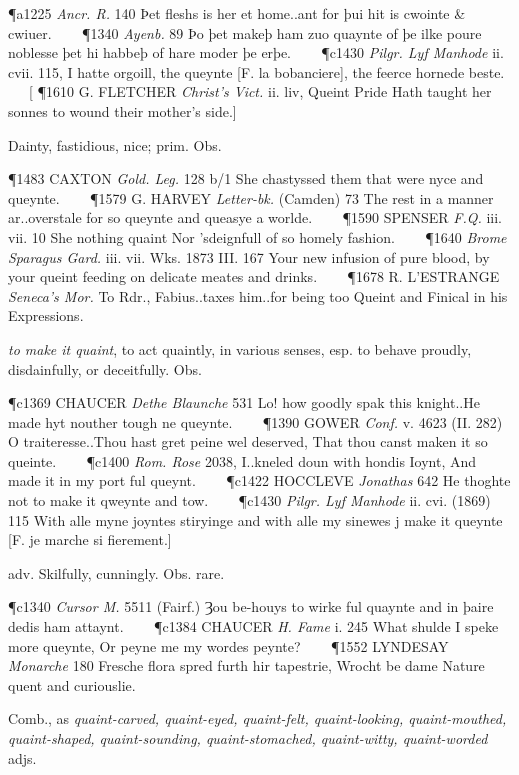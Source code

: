 \begin{description}[wide, labelwidth=!, labelindent=0pt]
\begin{myenumerate}
\P a1225  \textit{Ancr. R.} 140 Þet fleshs is her et home..ant for þui hit is cwointe \& cwiuer.    
\P 1340  \textit{Ayenb.} 89 Þo þet makeþ ham zuo quaynte of þe ilke poure noblesse þet hi habbeþ of hare moder þe erþe.    
\P c1430  \textit{Pilgr. Lyf Manhode} ii. cvii. 115, I hatte orgoill, the queynte [F. la bobanciere], the feerce hornede beste.    [
\P 1610 G. FLETCHER  \textit{Christ's Vict.} ii. liv, Queint Pride Hath taught her sonnes to wound their mother's side.]

 Dainty, fastidious, nice; prim. Obs.

\P 1483 CAXTON  \textit{Gold. Leg.} 128 b/1 She chastyssed them that were nyce and queynte.    
\P 1579 G. HARVEY  \textit{Letter-bk.} (Camden) 73 The rest in a manner ar..overstale for so queynte and queasye a worlde.    
\P 1590 SPENSER  \textit{F.Q.} iii. vii. 10 She nothing quaint Nor 'sdeignfull of so homely fashion.    
\P 1640  \textit{Brome Sparagus Gard.} iii. vii. Wks. 1873 III.  167 Your new infusion of pure blood, by your queint feeding on delicate meates and drinks.    
\P 1678 R. L'ESTRANGE  \textit{Seneca's Mor.} To Rdr., Fabius..taxes him..for being too Queint and Finical in his Expressions.

 \textit{to make it quaint}, to act quaintly, in various senses, esp. to behave proudly, disdainfully, or deceitfully. Obs.

\P c1369 CHAUCER  \textit{Dethe Blaunche} 531 Lo! how goodly spak this knight..He made hyt nouther tough ne queynte.    
\P 1390 GOWER  \textit{Conf.} v. 4623 (II. 282) O traiteresse..Thou hast gret peine wel deserved, That thou canst maken it so queinte.    
\P c1400  \textit{Rom. Rose} 2038, I..kneled doun with hondis Ioynt, And made it in my port ful queynt.    
\P c1422 HOCCLEVE  \textit{Jonathas} 642 He thoghte not to make it qweynte and tow.    
\P c1430  \textit{Pilgr. Lyf Manhode} ii. cvi. (1869) 115 With alle myne joyntes stiryinge and with alle my sinewes j make it queynte [F. je marche si fierement.]

 adv. Skilfully, cunningly. Obs. rare.

\P c1340  \textit{Cursor M.} 5511 (Fairf.) Ȝou be-houys to wirke ful quaynte and in þaire dedis ham attaynt.    
\P c1384 CHAUCER  \textit{H. Fame} i. 245 What shulde I speke more queynte, Or peyne me my wordes peynte?    
\P 1552 LYNDESAY  \textit{Monarche} 180 Fresche flora spred furth hir tapestrie, Wrocht be dame Nature quent and curiouslie.

 Comb., as \textit{quaint-carved, quaint-eyed, quaint-felt, quaint-looking, quaint-mouthed, quaint-shaped, quaint-sounding, quaint-stomached, quaint-witty, quaint-worded} adjs.


\end{myenumerate}
\end{description}

